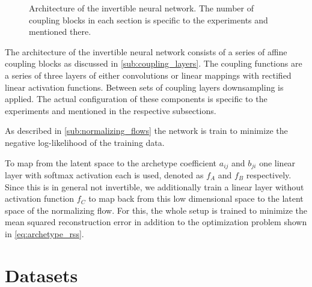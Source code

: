 \begin{figure}[htpb]
\begin{center}
\begin{subfigure}[]{0.45\textwidth}
\begin{center}
			\end{center}
		\end{subfigure}
	\end{center}
	\caption{Architecture of the invertible neural network. The number of
		coupling blocks in each section is specific to the experiments and
		mentioned there.}%
	\label{fig:inn_contents}
\end{figure}

The architecture of the invertible neural network consists of a series of
affine coupling blocks as discussed in \autoref{sub:coupling_layers}. The
coupling functions are a series of three layers of either convolutions or
linear mappings with rectified linear activation functions. Between sets of
coupling layers downsampling is applied. The actual configuration of these
components is specific to the experiments and mentioned in the respective
subsections.

As described in \autoref{sub:normalizing_flows} the network is train to
minimize the negative log-likelihood of the training data.

To map from the latent space to the archetype coefficient $a_{ij}$ and $b_{ji}$
one linear layer with softmax activation each is used, denoted as $f_A$ and
$f_B$ respectively. Since this is in general not invertible, we additionally
train a linear layer without activation function $f_C$ to map back from this
low dimensional space to the latent space of the normalizing flow. For this,
the whole setup is trained to minimize the mean squared reconstruction error in
addition to the optimization problem shown in \autoref{eq:archetype_rss}.


\section{Datasets}%
\label{sec:datasets}

